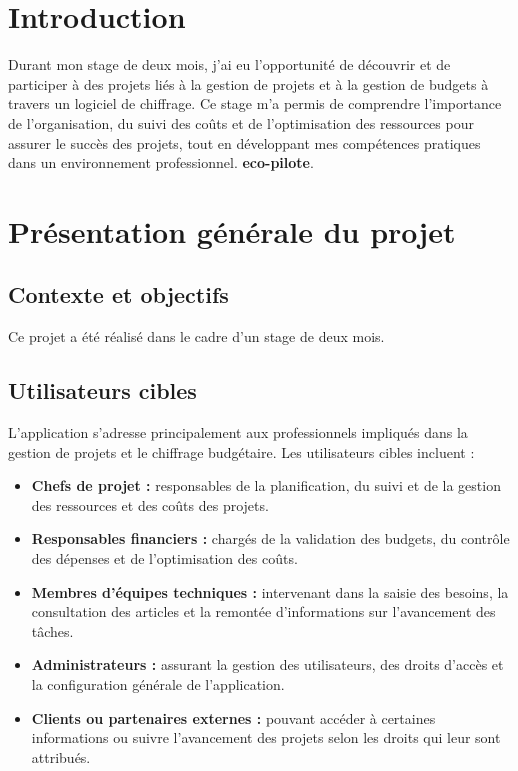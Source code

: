 \documentclass[12pt,a4paper]{report}
\begin{document}
\chapter{Introduction}
Durant mon stage de deux mois, j’ai eu l’opportunité de découvrir et de participer à des projets liés à la gestion de projets et à la gestion de budgets à travers un logiciel de chiffrage. Ce stage m’a permis de comprendre l’importance de l’organisation, du suivi des coûts et de l’optimisation des ressources pour assurer le succès des projets, tout en développant mes compétences pratiques dans un environnement professionnel. \textbf{eco-pilote}.  

\chapter{Présentation générale du projet }
\section{Contexte et objectifs}
Ce projet a été réalisé dans le cadre d’un stage de deux mois.  
\section{Utilisateurs cibles}
L’application s’adresse principalement aux professionnels impliqués dans la gestion de projets et le chiffrage budgétaire. Les utilisateurs cibles incluent :

\begin{itemize}
    \item \textbf{Chefs de projet :} responsables de la planification, du suivi et de la gestion des ressources et des coûts des projets.
    \item \textbf{Responsables financiers :} chargés de la validation des budgets, du contrôle des dépenses et de l’optimisation des coûts.
    \item \textbf{Membres d’équipes techniques :} intervenant dans la saisie des besoins, la consultation des articles et la remontée d’informations sur l’avancement des tâches.
    \item \textbf{Administrateurs :} assurant la gestion des utilisateurs, des droits d’accès et la configuration générale de l’application.
    \item \textbf{Clients ou partenaires externes :} pouvant accéder à certaines informations ou suivre l’avancement des projets selon les droits qui leur sont attribués.
\end{itemize}
\end{document}
